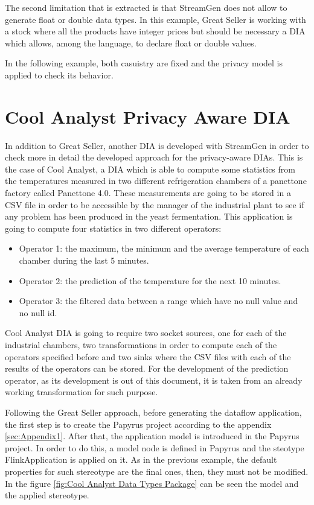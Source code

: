 The second limitation that is extracted is that StreamGen does not allow to generate float or double data types. In this example, Great Seller is working with a stock where all the products have integer prices but should be necessary a DIA which allows, among the language, to declare float or double values.

In the following example, both casuistry are fixed and the privacy model is applied to check its behavior.

\section{Cool Analyst Privacy Aware DIA}

In addition to Great Seller, another DIA is developed with StreamGen in order to check more in detail the developed approach for the privacy-aware DIAs. This is the case of Cool Analyst, a DIA which is able to compute some statistics from the temperatures measured in two different refrigeration chambers of a panettone factory called Panettone 4.0. These measurements are going to be stored in a CSV file in order to be accessible by the manager of the industrial plant to see if any problem has been produced in the yeast fermentation. This application is going to compute four statistics in two different operators:

\begin{itemize}
\item Operator 1: the maximum, the minimum and the average temperature of each chamber during the last 5 minutes.
\item Operator 2: the prediction of the temperature for the next 10 minutes.
\item Operator 3: the filtered data between a range which have no null value and no null id.
\end{itemize}

Cool Analyst DIA is going to require two socket sources, one for each of the industrial chambers, two transformations in order to compute each of the operators specified before and two sinks where the CSV files with each of the results of the operators can be stored. For the development of the prediction operator, as its development is out of this document, it is taken from an already working transformation for such purpose.

Following the Great Seller approach, before generating the dataflow application, the first step is to create the Papyrus project according to the appendix \ref{sec:Appendix1}. After that, the application model is introduced in the Papyrus project. In order to do this, a model node is defined in Papyrus and the steotype FlinkApplication is applied on it. As in the previous example, the default properties for such stereotype are the final ones, then, they must not be modified. In the figure \ref{fig:Cool Analyst Data Types Package} can be seen the model and the applied stereotype.

